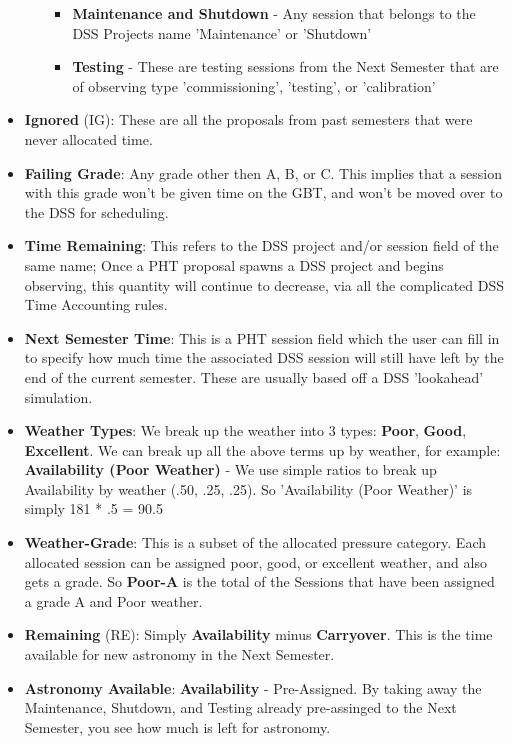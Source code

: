 \documentclass{article}
\begin{document}
\begin{itemize}
\begin{itemize}
\begin{itemize}
\item {\bf Maintenance and Shutdown} - Any session that belongs to the DSS Projects name 'Maintenance' or 'Shutdown'
\item {\bf Testing} - These are testing sessions from the Next Semester that are of observing type 'commissioning', 'testing', or 'calibration'
\end{itemize}
\end{itemize}
\item {\bf Ignored} (IG): These are all the proposals from past semesters that were never allocated time. 
\item {\bf Failing Grade}: Any grade other then A, B, or C. This implies that a session with this grade won't be given time on the GBT, and won't be moved over to the DSS for scheduling. 
\item {\bf Time Remaining}: This refers to the DSS project and/or session field of the same name; Once a PHT proposal spawns a DSS project and begins observing, this quantity will continue to decrease, via all the complicated DSS Time Accounting rules. 
\item {\bf Next Semester Time}: This is a PHT session field which the user can fill in to specify how much time the associated DSS session will still have left by the end of the current semester. These are usually based off a DSS 'lookahead' simulation. 
\item {\bf Weather Types}: We break up the weather into 3 types: {\bf Poor}, {\bf Good}, {\bf Excellent}. We can break up all the above terms up by weather, for example: {\bf Availability (Poor Weather)} - We use simple ratios to break up Availability by weather (.50, .25, .25). So 'Availability (Poor Weather)' is simply 181 * .5 = 90.5 
\item {\bf Weather-Grade}: This is a subset of the allocated pressure category. Each allocated session can be assigned poor, good, or excellent weather, and also gets a grade. So {\bf Poor-A} is the total of the Sessions that have been assigned a grade A and Poor weather. 
\item {\bf Remaining} (RE): Simply {\bf Availability} minus {\bf Carryover}.  This is the time available for new astronomy in the Next Semester. 
\item {\bf Astronomy Available}: {\bf Availability} - {Pre-Assigned}.  By taking away the Maintenance, Shutdown, and Testing already pre-assinged to the Next Semester, you see how much is left for astronomy.
\end{itemize}
\end{document}
